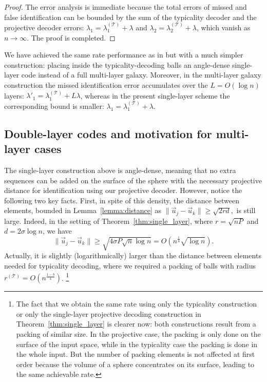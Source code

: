 \documentclass[10pt,conference]{IEEEtran}
\newcommand{\1}{\mathds{1}}
\newcommand{\cT}{\mathcal{T}}
\begin{document}
\begin{proof}
The error analysis is immediate because the total errors of missed and false identification can be bounded by the sum of the typicality decoder and the projective decoder errors: $\lambda_1=\lambda_1^{(\cT)}+\lambda$ and $\lambda_2=\lambda_2^{(\cT)}+\lambda$, which vanish as $n\to\infty$. The proof is completed.
\end{proof}

We have achieved the same rate performance as in \cite{galaxy-codes} but with a much simpler construction: placing inside the typicality-decoding balls an angle-dense single-layer code instead of a full multi-layer galaxy. Moreover, in the multi-layer galaxy construction the missed identification error accumulates over the $L=O(\log n)$ layers: $\lambda'_1=\lambda_1^{(\cT)}+L\lambda$, whereas in the present single-layer scheme the corresponding bound is smaller: $\lambda_1=\lambda_1^{(\cT)}+\lambda$.









\subsection{Double-layer codes and motivation for multi-layer cases}
The single-layer construction above is angle-dense, meaning that no extra sequences can be added on the surface of the sphere with the necessary projective distance for identification using our projective decoder. However, notice the following two key facts. First, in spite of this density, the distance between elements, bounded in Lemma~\ref{lemma:distance} as 
\(
\|\vec{u}_j-\vec{u}_k\|\geq\sqrt{2rd},
\) 
is still large. Indeed, in the setting of Theorem~\ref{thm:single_layer}, where $r=\sqrt{nP}$ and $d=2\sigma\log n$, we have 
\begin{equation}\label{eq:intuition_ball_size}
    \|\vec{u}_j-\vec{u}_k\|\geq\sqrt{4\sigma P\sqrt{n}\log n}=O\left(n^{\frac14}\sqrt{\log n}\right).
\end{equation}
Actually, it is slightly (logarithmically) larger than the distance between elements needed for typicality decoding,  where we required a packing of balls with radius $r^{(\cT)}=O(n^\frac{1-b}{4})$.
\footnote{The fact that we obtain the same rate using only the typicality construction or only the single-layer projective decoding construction in Theorem~\ref{thm:single_layer} is clearer now: both constructions result from a packing of similar size. In the projective case, the packing is only done on the surface of the input space, while in the typicality case the packing is done in the whole input. But the number of packing elements is not affected at first order because the volume of a sphere concentrates on its surface, leading to the same achievable rate.}
\end{document}
